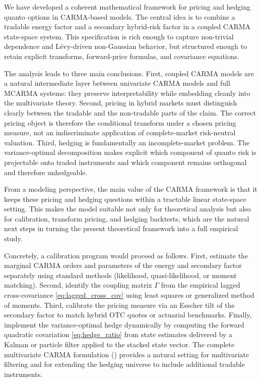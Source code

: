 \documentclass[10pt,a4paper,reqno]{amsart}
\newcommand{\1}{\mathbbm{1}}
\begin{document}
We have developed a coherent mathematical framework for pricing and hedging
quanto options in CARMA-based models. The central idea is to combine a tradable
energy factor and a secondary hybrid-risk factor in a coupled CARMA state-space
system. This specification is rich enough to capture non-trivial dependence and
Lévy-driven non-Gaussian behavior, but structured enough to retain explicit
transforms, forward-price formulas, and covariance equations.

The analysis leads to three main conclusions. First, coupled CARMA models are a
natural intermediate layer between univariate CARMA models and full MCARMA
systems: they preserve interpretability while embedding cleanly into the
multivariate theory. Second, pricing in hybrid markets must distinguish clearly
between the tradable and the non-tradable parts of the claim. The correct
pricing object is therefore the conditional transform under a chosen pricing
measure, not an indiscriminate application of complete-market risk-neutral
valuation. Third, hedging is fundamentally an incomplete-market problem. The
variance-optimal decomposition makes explicit which component of quanto risk is
projectable onto traded instruments and which component remains orthogonal and
therefore unhedgeable.

From a modeling perspective, the main value of the CARMA framework is that it
keeps these pricing and hedging questions within a tractable linear state-space
setting. This makes the model suitable not only for theoretical analysis but
also for calibration, transform pricing, and hedging backtests, which are the
natural next steps in turning the present theoretical framework into a full
empirical study.

Concretely, a calibration program would proceed as follows. First, estimate the
marginal CARMA orders and parameters of the energy and secondary factor
separately using standard methods (likelihood, quasi-likelihood, or moment
matching). Second, identify the coupling matrix \(\Gamma\) from the empirical
lagged cross-covariance \eqref{eq:lagged_cross_cov} using least squares or
generalized method of moments. Third, calibrate the pricing measure via an
Esscher tilt of the secondary factor to match hybrid OTC quotes or actuarial
benchmarks. Finally, implement the variance-optimal hedge dynamically by
computing the forward quadratic covariation
\eqref{eq:hedge_ratio} from state estimates delivered by a Kalman or particle
filter applied to the stacked state vector. The complete multivariate CARMA
formulation () provides a natural setting for
multivariate filtering and for extending the hedging universe to include
additional tradable instruments.



\end{document}
